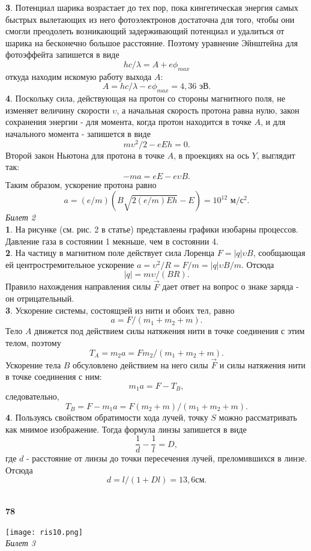 \begin{multicols}{2}
	\textbf{3}. Потенциал шарика возрастает до тех пор, пока кингетическая энергия самых быстрых вылетающих из него фотоэлектронов достаточна для того, чтобы они смогли преодолеть возникающий задерживающий потенциал и удалиться от шарика на бесконечно большое расстояние. Поэтому уравнение Эйнштейна для фотоэффейта запишется в виде
$$hc/\lambda = A + e\phi_{max}$$
откуда находим искомую работу выхода $A$:
$$A=hc/\lambda-e\phi_{max}=4,36 \text{ эВ.}$$ 
\textbf{4}. Поскольку сила, действующая на протон со стороны магнитного поля, не изменяет величину скорости $\upsilon$, а начальная скорость протона равна нулю, закон сохранения энергии - для момента, когда протон находится в точке $A$, и для начального момента - запишется в виде
$$m\upsilon^{2}/2-eEh=0.$$
Второй закон Ньютона для протона в точке $A$, в проекциях на ось $Y$, выглядит так:
$$-ma=eE-e\upsilon B.$$
Таким образом, ускорение протона равно
$$a=(e/m)(B\sqrt{2(e/m)Eh}-E)=10^{12} \text{ м/с$^{2}$.}$$
\textit{Билет 2}\\
\textbf{1}. На рисунке (см. рис. 2 в статье) представлены графики изобарны процессов. Давление газа в состоянии 1 мекньше, чем в состоянии 4.\\ \textbf{2}. На частицу в магнитном поле действует сила Лоренца $F=|q|\upsilon B$, сообщающая ей центростремительное ускорение $a=\upsilon^{2}/R=F/m=|q|\upsilon B/m$. Отсюда
$$|q|=m\upsilon/(BR).$$
Правило нахождения направления силы $\vec{F}$ дает ответ на вопрос о знаке заряда - он отрицательный.\\
\textbf{3}. Ускорение системы, состоящзей из нити и обоих тел, равно 
$$a=F/(m_{1}+m_{2}+m).$$
Тело $A$ движется под действием силы натяжения нити в точке соединения с этим телом, поэтому 
$$T_{A}=m_{2}a=Fm_{2}/(m_{1}+m_{2}+m).$$
Ускорение тела $B$ обсуловлено действием на него силы $\vec{F}$ и силы натяжения нити в точке соединения с ним:
$$m_{1}a=F-T_{B},$$
следовательно, $$T_{B}=F-m_{1}a=F(m_{2}+m)/(m_{1}+m_{2}+m).$$
\textbf{4}. Пользуясь свойством обратимости хода лучей, точку $S$ можно рассматривать как мнимое изображение. Тогда формула линзы запишется в виде
$$\frac{1}{d}-\frac{1}{l}=D,$$ где $d$ - расстояние от линзы до точки пересечения лучей, преломившихся в линзе. Отсюда $$d=l/(1+Dl)=13,6 \text{см.}$$\\
\begin{flushleft}
	\Huge{\textbf{78}}
\end{flushleft}
\columnbreak
\texttt{[image: ris10.png]}
\\
\textit{Билет 3}\\

\end{multicols}
